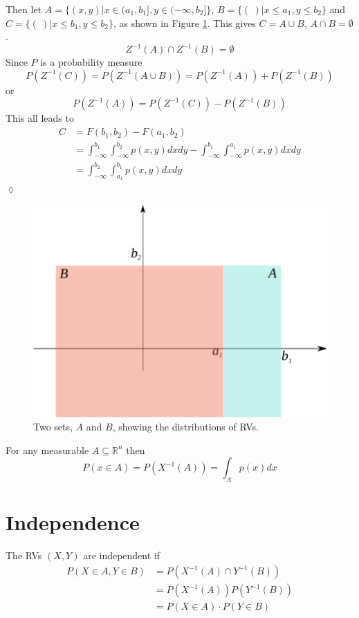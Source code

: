 \documentclass[lecture,12pt,]{pcms-l}
\begin{document}
Then let $A=\lbrace(x,y) | x\in(a_1,b_1], y\in(-\infty,b_2]\rbrace$, $B=\lbrace(~) | x\leq a_1, y\leq b_2\rbrace$ and $C=\lbrace(~)|x\leq b_1, y\leq b_2\rbrace$, as shown in Figure \ref{fig:02twoSets}. This gives $C=A\cup B$, $A\cap B=\emptyset$.
$$Z^{-1}(A)\cap Z^{-1}(B) = \emptyset$$
Since $P$ is a probability measure
$$P(Z^{-1}(C)) = P(Z^{-1}(A\cup B)) = P(Z^{-1}(A))+P(Z^{-1}(B))$$
or
$$P(Z^{-1}(A))=P(Z^{-1}(C))-P(Z^{-1}(B))$$
This all leads to
\begin{align*}
C &= F(b_1,b_2) - F(a_1,b_2) \\
&= \int_{-\infty}^{b_1}\int_{-\infty}^{b_2} p(x,y)dxdy - \int_{-\infty}^{b_1}\int_{-\infty}^{a_1}p(x,y)dxdy \\
&= \int_{-\infty}^{b_2}\int_{a_1}^{b_1} p(x,y)dxdy
\end{align*}
$\lozenge$
\begin{figure}[ht!]
	\centering
	\includegraphics[width=.35\textwidth]{images/02twoSets}
	\caption{Two sets, $A$ and $B$, showing the distributions of RVs.}
	\label{fig:02twoSets}
\end{figure}

\begin{theorem}
For any measurable $A\subseteq\mathbb{R}^n$ then
$$P(x\in A)=P(X^{-1}(A)) = \int_Ap(x)dx$$
\end{theorem}

\section{Independence}
\begin{definition}
The RVs $(X,Y)$ are independent if
\begin{align*}
P(X\in A, Y\in B) &= P(X^{-1}(A) \cap Y^{-1}(B)) \\
&= P(X^{-1}(A)) P(Y^{-1}(B)) \\
&= P(X\in A) \cdot P(Y\in B)
\end{align*}
\end{definition}
\end{document}
